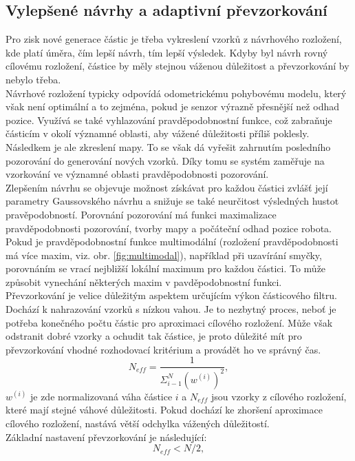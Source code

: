 \documentclass[12pt]{report}
\begin{document}
\subsection{Vylepšené návrhy a adaptivní převzorkování}
Pro zisk nové generace částic je třeba vykreslení vzorků z návrhového rozložení, kde platí úměra, čím lepší návrh, tím lepší výsledek. Kdyby byl návrh rovný cílovému rozložení, částice by měly stejnou váženou důležitost a převzorkování by nebylo třeba. \\
\indent Návrhové rozložení typicky odpovídá odometrickému pohybovému modelu, který však není optimální a to zejména, pokud je senzor výrazně přesnější než odhad pozice. Využívá se také vyhlazování pravděpodobnostní funkce, což zabraňuje částicím v okolí významné oblasti, aby vážené důležitosti příliš poklesly. Následkem je ale zkreslení mapy. To se však dá vyřešit zahrnutím posledního pozorování do generování nových vzorků. Díky tomu se systém zaměřuje na vzorkování ve významné oblasti pravděpodobnosti pozorování.\\
\indent Zlepšením návrhu se objevuje možnost získávat pro každou částici zvlášť její parametry Gaussovského návrhu a snižuje se také neurčitost výsledných hustot pravěpodobností. Porovnání pozorování má funkci maximalizace pravděpodobnosti pozorování, tvorby mapy a počáteční odhad pozice robota. Pokud je pravděpodobnostní funkce multimodální (rozložení pravděpodobnosti má více maxim, viz. obr. \ref{fig:multimodal}), například při uzavírání smyčky, porovnáním se vrací nejbližší lokální maximum pro každou částici. To může způsobit vynechání některých maxim v pavděpodobnostní funkci.\\
\indent Převzorkování je velice důležitým aspektem určujícím výkon částicového filtru. Dochází k nahrazování vzorků s nízkou vahou. Je to nezbytný proces, neboť je potřeba konečného počtu částic pro aproximaci cílového rozložení. Může však odstranit dobré vzorky a ochudit tak částice, je proto důležité mít pro převzorkování vhodné rozhodovací kritérium a provádět ho ve správný čas. 
\begin{equation}
	N_{eff}=\frac{1}{\varSigma_{i-1}^N(w^{(i)})^2},
\end{equation} 
$w^{(i)}$ je zde normalizovaná váha částice $i$ a $N_{eff}$ jsou vzorky z cílového rozložení, které mají stejné váhové důležitosti. Pokud dochází ke zhoršení aproximace cílového rozložení, nastává větší odchylka vážených důležitostí.\\
Základní nastavení převzorkování je následující:
\begin{equation}
	N_{eff} < N/2,
\end{equation}
\end{document}

